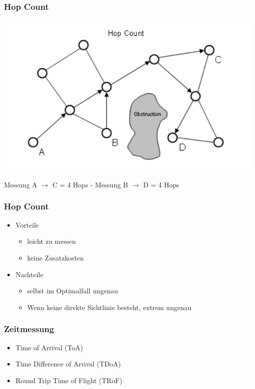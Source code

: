 \begin{frame}
  \frametitle{Hop Count}

  \begin{center}
  \includegraphics[scale=0.5]{img/hop_count1}
  \\~\\
  Messung A $\to$ C = 4 Hops - Messung B $\to$ D = 4 Hops
  \end{center}
\end{frame}

\begin{frame}
\frametitle{Hop Count}

\begin{itemize}
  \item Vorteile
  \begin{itemize}
    \item leicht zu messen
    \item keine Zusatzkosten
  \end{itemize}
  \item Nachteile
  \begin{itemize}
    \item selbst im Optimalfall ungenau
    \item Wenn keine direkte Sichtlinie besteht, extrem ungenau
  \end{itemize}
\end{itemize}

\end{frame}

\begin{frame}
\frametitle{Zeitmessung}

\begin{itemize}
  \item Time of Arrival (ToA)
  \item Time Difference of Arrival (TDoA)
  \item Round Trip Time of Flight (TRoF)
\end{itemize}
\end{frame}

